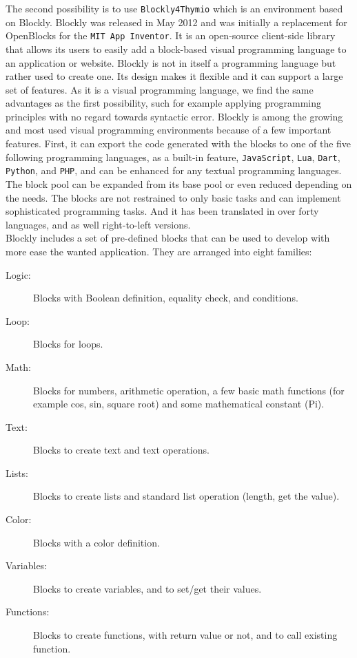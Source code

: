 \documentclass{scrbook}
\begin{document}
The second possibility is to use \texttt{Blockly4Thymio} which is an environment based on Blockly. Blockly was released in May 2012 and was initially a replacement for OpenBlocks for the \texttt{MIT App Inventor}. 
It is an open-source client-side library that allows its users to easily add a block-based visual programming language to an application or website. 
Blockly is not in itself a programming language but rather used to create one. Its design makes it flexible and it can support a large set of features. 
As it is a visual programming language, we find the same advantages as the first possibility, such for example applying programming principles with no regard towards syntactic error.
Blockly is among the growing and most used visual programming environments because of a few important features. First, it can export the code generated with the blocks to one of the five following programming languages, 
as a built-in feature, \texttt{JavaScript}, \texttt{Lua}, \texttt{Dart}, \texttt{Python}, and \texttt{PHP}, and can be enhanced for any textual programming languages. 
The block pool can be expanded from its base pool or even reduced depending on the needs. The blocks are not restrained to only basic tasks and can implement sophisticated programming tasks. 
And it has been translated in over forty languages, and as well right-to-left versions. \\

Blockly includes a set of pre-defined blocks that can be used to develop with more ease the wanted application. They are arranged into eight families:
\begin{description}
  \item [Logic:] Blocks with Boolean definition, equality check, and conditions.
  \item [Loop:] Blocks for loops.
  \item [Math:] Blocks for numbers, arithmetic operation, a few basic math functions (for example cos, sin, square root) and some mathematical constant (Pi).
  \item [Text:] Blocks to create text and text operations.
  \item [Lists:] Blocks to create lists and standard list operation (length, get the value).
  \item [Color:] Blocks with a color definition.
  \item [Variables:] Blocks to create variables, and to set/get their values.
  \item [Functions:] Blocks to create functions, with return value or not, and to call existing function.
\end{description}
\end{document}
